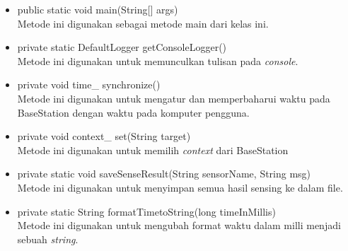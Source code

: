 \begin{itemize}
	\item public static void main(String[] args) \\
		Metode ini digunakan sebagai metode main dari kelas ini. 
	\item private static DefaultLogger getConsoleLogger()\\
		Metode ini digunakan untuk memunculkan tulisan pada {\it console}.
	\item private void time\_ synchronize() \\
		Metode ini digunakan untuk mengatur dan memperbaharui waktu pada BaseStation dengan waktu pada komputer pengguna.
	\item private void context\_ set(String target)\\
		Metode ini digunakan untuk memilih {\it context} dari BaseStation
	\item private static void saveSenseResult(String sensorName, String msg) \\
		Metode ini digunakan untuk menyimpan semua hasil sensing ke dalam file.
	\item private static String formatTimetoString(long timeInMillis) \\
		Metode ini digunakan untuk mengubah format waktu dalam milli menjadi sebuah {\it string}.
\end{itemize}


